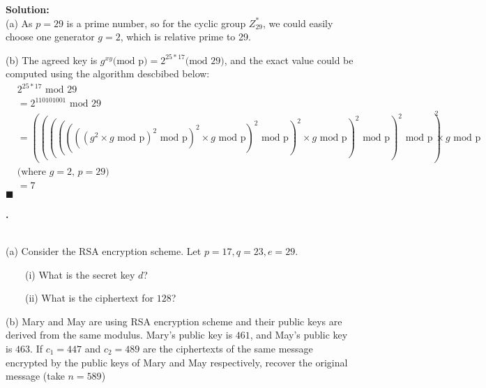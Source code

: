 \documentclass{article}
\newcounter{pcounter}                                   %
\newenvironment{problem}                                %
{                                                       %
    \stepcounter{pcounter}                              %
    \textbf{\arabic{pcounter}.}                         %
}{}                                                     %
\newenvironment{solution}                               %
{\textbf{Solution:} \\}{$\blacksquare$\newline}         %
\newcommand{\tab}{\ \ \ \ }                             %
\newcommand{\GmodP}{\times{g}\text{ mod p}}
\newcommand{\modP}{\text{ mod p}}
\begin{document}
    \begin{solution}
        (a) As $p = 29$ is a prime number, so for the cyclic group $Z^*_{29}$, we could easily choose one generator $g = 2$, which is relative prime to 29.

        (b) The agreed key is $g^{xy} \text{(mod p)} = 2^{25*17} \text{(mod 29)}$, and the exact value could be computed using the algorithm descbibed below: 
        \begin{align*}
            &2^{25*17} \text{ mod 29} \\
            &= 2^{110101001} \text{ mod 29} \\
            &= (((((((g^2 \GmodP)^2 \modP)^2 \GmodP)^2 \modP)^2 \GmodP)^2 \modP)^2 \modP)^2 \GmodP \\
            &\text{(where $g=2$, $p=29$)} \\
            &= 7
        \end{align*}
    \end{solution}

    \begin{problem}
        \\
        (a) Consider the RSA encryption scheme. Let $p=17, q=23, e=29$.

        \tab (i) What is the secret key $d$?

        \tab (ii) What is the ciphertext for $128$?
        
        (b) Mary and May are using RSA encryption scheme and their public keys are derived from the same modulus.
        Mary's public key is $461$, and May's public key is $463$.
        If $c_1 = 447$ and $c_2 = 489$ are the ciphertexts of the same message encrypted by the public keys of Mary and May respectively, recover the original message (take $n=589$)
    \end{problem}
    
\end{document}
